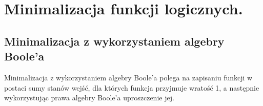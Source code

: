 \documentclass[12pt]{article}
\begin{document}
    \newpage
    
    \section{Minimalizacja funkcji logicznych.}
    
    \subsection{Minimalizacja z wykorzystaniem algebry Boole'a}
    \begin{definition}
    Minimalizacja z wykorzystaniem algebry Boole'a polega na zapisaniu funkcji w postaci sumy stanów wejść, dla których funkcja przyjmuje wratość 1, a następnie wykorzystując prawa algebry Boole'a uproszczenie jej.
    \end{definition}
    
\end{document}
